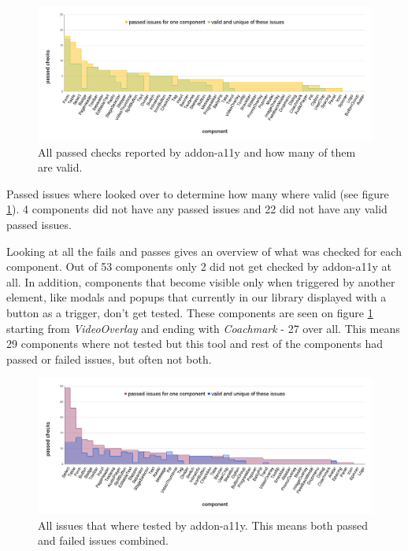\documentclass{master_thesis}
\begin{document}
\begin{figure}[H]
	\includegraphics[width=\textwidth]{img/audit-passed.png}
	\caption{All passed checks reported by addon-a11y and how many of them are valid. }
	\label{fig:audit-passed}
\end{figure}
Passed issues where looked over to determine how many where valid (see figure \ref{fig:audit-passed}). 4 components did not have any passed issues and 22 did not have any valid passed issues.

Looking at all the fails and passes gives an overview of what was checked for each component. Out of 53 components only 2 did not get checked by addon-a11y at all. In addition, components that become visible only when triggered by another element, like modals and popups that currently in our library displayed with a button as a trigger, don't get tested. These components are seen on figure \ref{fig:audit-passed} starting from \textit{VideoOverlay} and ending with \textit{Coachmark} - 27 over all. This means 29 components where not tested but this tool and rest of the components had passed or failed issues, but often not both.

\begin{figure}[H]
	\includegraphics[width=\textwidth]{img/audit-all.png}
	\caption{All issues that where tested by addon-a11y. This means both passed and failed issues combined.}
	\label{fig:audit-all}
\end{figure}
\end{document}
